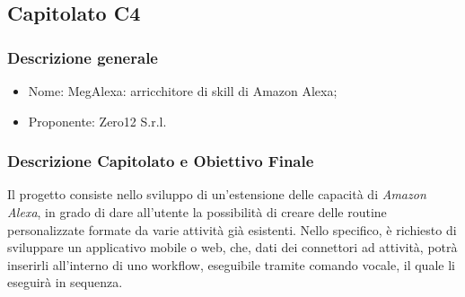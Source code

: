 \subsection{Capitolato C4}\label{C4}

\subsubsection{Descrizione generale}
\begin{itemize}
	\item Nome: MegAlexa: arricchitore di skill di Amazon Alexa;
	\item Proponente: Zero12 S.r.l.
\end{itemize}

\subsubsection{Descrizione Capitolato e Obiettivo Finale}
Il progetto consiste nello sviluppo di un'estensione delle capacità di \textit{Amazon Alexa}\glossario, in grado di dare all'utente la possibilità di creare delle routine personalizzate formate da varie attività già esistenti.
Nello specifico, è richiesto di sviluppare un applicativo mobile o web, che, dati dei connettori ad attività, potrà inserirli all'interno di uno workflow, eseguibile tramite comando vocale, il quale li eseguirà in sequenza.

